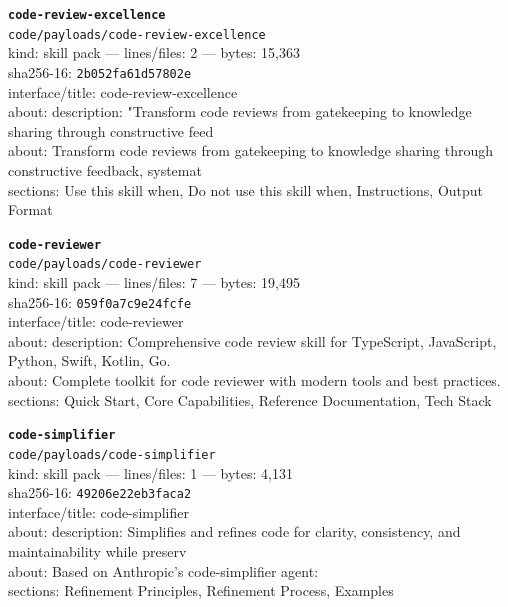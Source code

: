 \noindent\textbf{\texttt{code-review-excellence}}\\
\texttt{code/payloads/code-review-excellence}\\
kind: skill pack --- lines/files: 2 --- bytes: 15,363\\
sha256-16: \texttt{2b052fa61d57802e}\\
interface/title: code-review-excellence\\
about: description: "Transform code reviews from gatekeeping to knowledge sharing through constructive feed\\
about: Transform code reviews from gatekeeping to knowledge sharing through constructive feedback, systemat\\
sections: Use this skill when, Do not use this skill when, Instructions, Output Format\\
\vspace*{6.0pt}
\newpage

\noindent\textbf{\texttt{code-reviewer}}\\
\texttt{code/payloads/code-reviewer}\\
kind: skill pack --- lines/files: 7 --- bytes: 19,495\\
sha256-16: \texttt{059f0a7c9e24fcfe}\\
interface/title: code-reviewer\\
about: description: Comprehensive code review skill for TypeScript, JavaScript, Python, Swift, Kotlin, Go. \\
about: Complete toolkit for code reviewer with modern tools and best practices.\\
sections: Quick Start, Core Capabilities, Reference Documentation, Tech Stack\\
\vspace*{6.0pt}

\noindent\textbf{\texttt{code-simplifier}}\\
\texttt{code/payloads/code-simplifier}\\
kind: skill pack --- lines/files: 1 --- bytes: 4,131\\
sha256-16: \texttt{49206e22eb3faca2}\\
interface/title: code-simplifier\\
about: description: Simplifies and refines code for clarity, consistency, and maintainability while preserv\\
about: Based on Anthropic's code-simplifier agent:\\
sections: Refinement Principles, Refinement Process, Examples\\
\vspace*{6.0pt}

